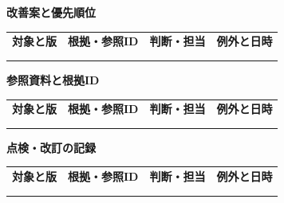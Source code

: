 \documentclass[11pt,a4paper]{article}
\begin{document}
\par{}\noindent\textbf{改善案と優先順位}\par\vspace{1mm}
{\fontsize{8.5}{13}\selectfont
\begin{tabularx}{\linewidth}{@{}XXXX@{}}
\textbf{対象と版} & \textbf{根拠・参照ID} & \textbf{判断・担当} & \textbf{例外と日時}\\[2mm]
\strut & \strut & \strut & \strut\\[5mm]
\strut & \strut & \strut & \strut\\[5mm]
\end{tabularx}
}\vspace{2mm}\par
{}
\par{}\noindent\textbf{参照資料と根拠ID}\par\vspace{1mm}
{\fontsize{8.5}{13}\selectfont
\begin{tabularx}{\linewidth}{@{}XXXX@{}}
\textbf{対象と版} & \textbf{根拠・参照ID} & \textbf{判断・担当} & \textbf{例外と日時}\\[2mm]
\strut & \strut & \strut & \strut\\[5mm]
\strut & \strut & \strut & \strut\\[5mm]
\end{tabularx}
}\vspace{2mm}\par
{}
\par{}\noindent\textbf{点検・改訂の記録}\par\vspace{1mm}
{\fontsize{8.5}{13}\selectfont
\begin{tabularx}{\linewidth}{@{}XXXX@{}}
\textbf{対象と版} & \textbf{根拠・参照ID} & \textbf{判断・担当} & \textbf{例外と日時}\\[2mm]
\strut & \strut & \strut & \strut\\[5mm]
\strut & \strut & \strut & \strut\\[5mm]
\end{tabularx}
}\vspace{2mm}\par
\end{document}
